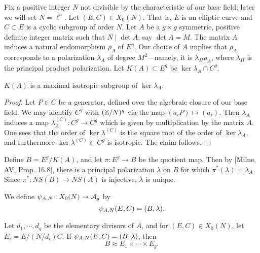 \documentclass{amsart}
\begin{document}
Fix a positive integer $N$ not divisible by the characteristic of our base field; later we will set $N = \ell^n$. Let $(E, C) \in X_0(N)$. That is, $E$ is an elliptic curve and $C \subset E$ is a cyclic subgroup of order $N$. Let $A$ be a $g \times g$ symmetric, positive definite integer matrix such that $N \mid \det A$; say $\det A = M$. The matrix $A$ induces a natural endomorphism $\rho_A$ of $E^g$. Our choice of $A$ implies that $\rho_A$ corresponds to a polarization $\lambda_A$ of degree $M^2$---namely, it is $\lambda_{\Pi}\rho_A$, where $\lambda_\Pi$ is the principal product polarization. Let $K(A) \subset E^g$ be $\ker \lambda_A \cap C^g$.

\begin{lemma}
  $K(A)$ is a maximal isotropic subgroup of $\ker \lambda_A$.
\end{lemma}

\begin{proof}
  Let $P \in C$ be a generator, defined over the algebraic closure of our base field. We may identify $C^g$ with $(\mathbb{Z}/N)^g$ via the map $(a_iP) \mapsto (a_i)$. Then $\lambda_A$ induces a map $\lambda_A^{(C)}:C^g \to C^g$ which is given by multiplication by the matrix $A$. One sees that the order of $\ker \lambda^{(C)}$ is the square root of the order of $\ker \lambda_A$, and furthermore $\ker \lambda^{(C)} \subset C^g$ is isotropic. The claim follows.
\end{proof}

Define $B = E^g/K(A)$, and let $\pi: E^g \to B$ be the quotient map. Then by [Milne, AV, Prop. 16.8], there is a principal polarization $\lambda$ on $B$ for which $\pi^*(\lambda) = \lambda_A$. Since $\pi^*: NS(B) \to NS(A)$ is injective, $\lambda$ is unique.

We define $\psi_{A,N}: X_0(N) \to \mathcal{A}_g$ by
\[
  \psi_{A,N}(E,C) = (B,\lambda).
\]

\begin{proposition}
  Let $d_1, \cdots, d_g$ be the elementary divisors of $A$, and for $(E,C) \in X_0(N)$, let $E_i = E/(N/d_i)C$. If $\psi_{A,N}(E,C) = (B,\lambda)$, then
  \[
    B \approx E_1 \times \cdots \times E_g.
  \]
\end{proposition}
\end{document}

